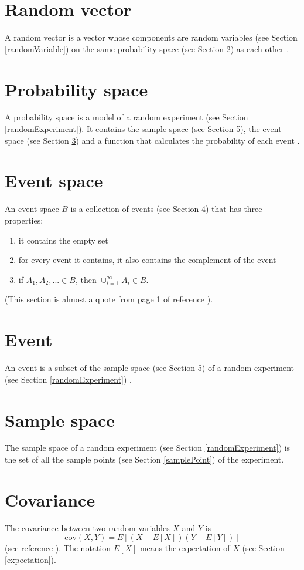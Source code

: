 \documentclass{article}
\begin{document}
\section{Random vector} \label{randomVector}
A random vector is a vector whose components are random variables (see Section \ref{randomVariable}) on the same probability space (see Section \ref{probabilitySpace}) as each other \cite{wpRandomVector}.
\section{Probability space} \label{probabilitySpace}
A probability space is a model of a random experiment (see Section \ref{randomExperiment}).  It contains the sample space (see Section \ref{sampleSpace}), the event space (see Section \ref{eventSpace}) and a function that calculates the probability of each event \cite{wpProbabilitySpace}.
\section{Event space} \label{eventSpace}
An event space $B$ is a collection of events (see Section \ref{event}) that has three properties:
\begin{enumerate}
\item it contains the empty set
\item for every event it contains, it also contains the complement of the event
\item if $A_1, A_2, ...\in B$, then $\cup^\infty_{i=1}A_i\in B$.
\end{enumerate}
(This section is almost a quote from page 1 of reference \cite{shum}).
\section{Event} \label{event}
An event is a subset of the sample space (see Section \ref{sampleSpace}) of a random experiment (see Section \ref{randomExperiment}) \cite{shum}.
\section{Sample space} \label{sampleSpace}
The sample space of a random experiment (see Section \ref{randomExperiment}) is the set of all the sample points (see Section \ref{samplePoint}) of the experiment.
\section{Covariance} \label{covariance}
The covariance between two random variables $X$ and $Y$ is
\[\text{cov}\left(X, Y\right) = E\left[\left(X-E[X]\right)\left(Y-E[Y]\right)\right]\]
(see reference \cite{wpCovariance}).
The notation $E[X]$ means the expectation of $X$ (see Section \ref{expectation}).
\end{document}
